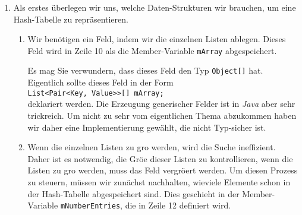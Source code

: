 \begin{enumerate}
\item Als erstes \"uberlegen wir uns, welche Daten-Strukturen wir brauchen,
      um eine Hash-Tabelle zu repr\"asentieren.
      \begin{enumerate}
      \item Wir ben\"otigen ein Feld, indem wir die einzelnen Listen ablegen.
            Dieses Feld wird in Zeile 10 als die Member-Variable \texttt{mArray}
            abgespeichert.

            Es mag Sie verwundern, dass dieses Feld den Typ \texttt{Object[]} hat.
            Eigentlich sollte dieses Feld in der Form \\[0.2cm]
            \hspace*{1.3cm} \texttt{List<Pair<Key, Value>>[] mArray;} \\[0.2cm]
            deklariert werden.  Die Erzeugung generischer Felder ist in \textsl{Java} 
            aber sehr trickreich.  Um nicht zu sehr vom eigentlichen Thema abzukommen
            haben wir daher eine Implementierung gew\"ahlt, die nicht Typ-sicher ist.
      \item Wenn die einzelnen Listen zu gro\3 werden, wird die Suche ineffizient.
            Daher ist es notwendig, die Gr\"o\3e dieser Listen zu kontrollieren,
            wenn die Listen zu gro\3 werden, muss das Feld vergr\"o\3ert werden.
            Um diesen Prozess zu steuern, m\"ussen wir zun\"achst nachhalten, 
            wieviele Elemente schon in der Hash-Tabelle abgespeichert sind.
            Dies geschieht in der Member-Variable \texttt{mNumberEntries}, die in Zeile 12
            definiert wird.


\end{enumerate}
\end{enumerate}
